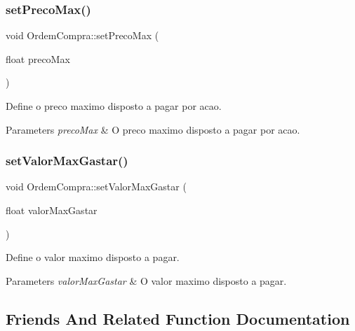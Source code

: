 \subsubsection{\texorpdfstring{set\+Preco\+Max()}{setPrecoMax()}}
{\footnotesize\ttfamily void Ordem\+Compra\+::set\+Preco\+Max (\begin{DoxyParamCaption}\item[{float}]{preco\+Max }\end{DoxyParamCaption})\hspace{0.3cm}{\ttfamily [inline]}}



Define o preco maximo disposto a pagar por acao. 


\begin{DoxyParams}{Parameters}
{\em preco\+Max} & O preco maximo disposto a pagar por acao. \\
\hline
\end{DoxyParams}
\hypertarget{class_ordem_compra_ada9283bb3eda59fd0f6b10aa7e2b86c2}{}\label{class_ordem_compra_ada9283bb3eda59fd0f6b10aa7e2b86c2} 
\subsubsection{\texorpdfstring{set\+Valor\+Max\+Gastar()}{setValorMaxGastar()}}
{\footnotesize\ttfamily void Ordem\+Compra\+::set\+Valor\+Max\+Gastar (\begin{DoxyParamCaption}\item[{float}]{valor\+Max\+Gastar }\end{DoxyParamCaption})\hspace{0.3cm}{\ttfamily [inline]}}



Define o valor maximo disposto a pagar. 


\begin{DoxyParams}{Parameters}
{\em valor\+Max\+Gastar} & O valor maximo disposto a pagar. \\
\hline
\end{DoxyParams}


\subsection{Friends And Related Function Documentation}
\hypertarget{class_ordem_compra_af2f3323b475ba777c890c63648d24e5d}{}\label{class_ordem_compra_af2f3323b475ba777c890c63648d24e5d} 
